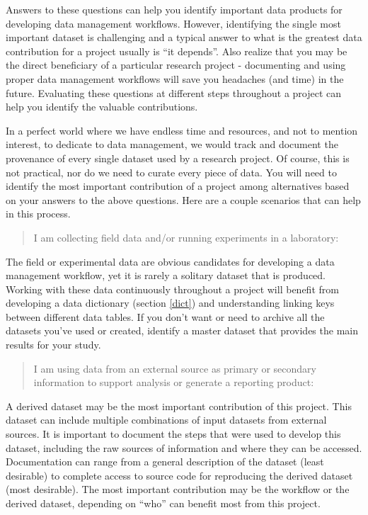 \documentclass[
]{book}
\begin{document}
Answers to these questions can help you identify important data products for developing data management workflows. However, identifying the single most important dataset is challenging and a typical answer to what is the greatest data contribution for a project usually is ``it depends''. Also realize that you may be the direct beneficiary of a particular research project - documenting and using proper data management workflows will save you headaches (and time) in the future. Evaluating these questions at different steps throughout a project can help you identify the valuable contributions.

In a perfect world where we have endless time and resources, and not to mention interest, to dedicate to data management, we would track and document the provenance of every single dataset used by a research project. Of course, this is not practical, nor do we need to curate every piece of data. You will need to identify the most important contribution of a project among alternatives based on your answers to the above questions. Here are a couple scenarios that can help in this process.

\begin{quote}
I am collecting field data and/or running experiments in a laboratory:
\end{quote}

The field or experimental data are obvious candidates for developing a data management workflow, yet it is rarely a solitary dataset that is produced. Working with these data continuously throughout a project will benefit from developing a data dictionary (section \ref{dict}) and understanding linking keys between different data tables. If you don't want or need to archive all the datasets you've used or created, identify a master dataset that provides the main results for your study.

\begin{quote}
I am using data from an external source as primary or secondary information to support analysis or generate a reporting product:
\end{quote}

A derived dataset may be the most important contribution of this project. This dataset can include multiple combinations of input datasets from external sources. It is important to document the steps that were used to develop this dataset, including the raw sources of information and where they can be accessed. Documentation can range from a general description of the dataset (least desirable) to complete access to source code for reproducing the derived dataset (most desirable). The most important contribution may be the workflow or the derived dataset, depending on ``who'' can benefit most from this project.
\end{document}
